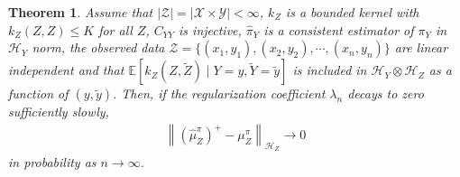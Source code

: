 \documentclass[a4paper]{article}
\renewcommand{\cal}{\mathcal}
\newcommand{\bb}{\mathbb}
\newcommand{\norm}[1]{\left\lVert#1\right\rVert}
\newtheorem{theorem}{Theorem}
\begin{document}
\begin{theorem}\label{thm:main}
Assume that $|\cal{Z}| = |\cal{X}\times\cal{Y}| < \infty$, $k_Z$ is a bounded kernel with $k_Z(Z,Z) \leq K$ for all $Z$, $C_{YY}$ is injective, $\widehat{\pi}_Y$ is a consistent estimator of $\pi_Y$ in $\cal{H}_Y$ norm, the observed data $\cal{Z} = \{ (x_1,y_1),(x_2,y_2),\cdots,(x_n,y_n) \}$ are linear independent and that $\bb{E}[k_Z(Z,\tilde{Z})\mid Y=y,\tilde{Y}=\tilde{y}]$ is included in $\cal{H}_Y \otimes \cal{H}_Z$ as a function of $(y,\tilde{y})$. Then, if the regularization coefficient $\lambda_n$ decays to zero sufficiently slowly,
\begin{align}
\norm{(\widehat{\mu}_Z^{\pi})^+ - \mu_Z^\pi}_{\cal{H}_Z} \rightarrow 0 
\end{align}
in probability as $n\rightarrow\infty$.
\end{theorem}
\end{document}
